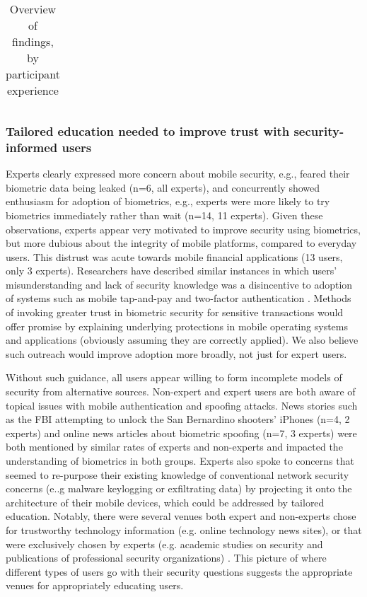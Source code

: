 \begin{table*}[t]
\begin{tabularx}{\textwidth}{ X | X | X }
  \end{tabularx}
  \caption{Overview of findings, by participant experience}
\label{tab:overview}
\end{table*}


\subsubsection{Tailored education needed to improve trust with security-informed users}
Experts clearly expressed more concern about mobile security, e.g., feared their
biometric data being leaked (n=6, all experts), and concurrently showed
enthusiasm for adoption of biometrics, e.g., experts were more likely to try
biometrics immediately rather than wait (n=14, 11 experts). Given these observations, experts appear very motivated to improve security using biometrics, but more dubious about the integrity of mobile platforms, compared to everyday users. This distrust was acute towards mobile financial applications (13 users, only 3 experts). Researchers have described similar instances in which users' misunderstanding and lack of security knowledge was a disincentive to adoption of systems such as mobile tap-and-pay \cite{huh2017don} and two-factor authentication \cite{ion2015no}. Methods of invoking greater trust in biometric security for sensitive transactions would offer promise by explaining underlying protections in mobile operating systems and applications (obviously assuming they are correctly applied). We also believe such outreach would improve adoption more broadly, not just for expert users. 

Without such guidance, all users appear willing to form incomplete models of security from alternative sources. Non-expert and expert users are both aware of topical issues with mobile authentication and spoofing attacks. News stories such as the FBI attempting to unlock the San Bernardino shooters' iPhones (n=4, 2 experts) and online news articles about biometric spoofing (n=7, 3 experts) were both mentioned by similar rates of experts and non-experts and impacted the understanding of biometrics in both groups. Experts also spoke to concerns that seemed to re-purpose their existing knowledge of conventional network security concerns (e..g malware keylogging or exfiltrating data) by projecting it onto the architecture of their mobile devices, which could be addressed by tailored education. Notably, there were several venues both expert and non-experts chose for trustworthy technology information (e.g. online technology news sites), or that were exclusively chosen by experts (e.g. academic studies on security and publications of professional security organizations) . This picture of where different types of users go with their security questions suggests the appropriate venues for appropriately educating users. 

